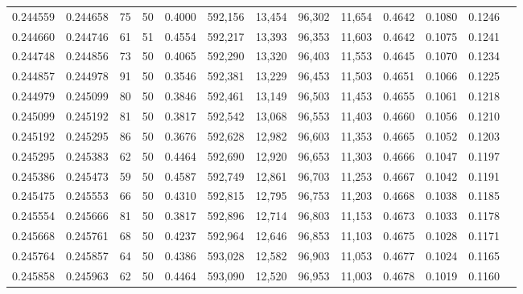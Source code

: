 \begin{tabular}{rrrrrrrrrrrrr}
0.244559 & 0.244658 &    75 &  50 &                                     0.4000 & 592,156 &  13,454 &  96,302 &  11,654 & 0.4642 & 0.1080 & 0.1246 \\
0.244660 & 0.244746 &    61 &  51 &                                     0.4554 & 592,217 &  13,393 &  96,353 &  11,603 & 0.4642 & 0.1075 & 0.1241 \\
0.244748 & 0.244856 &    73 &  50 &                                     0.4065 & 592,290 &  13,320 &  96,403 &  11,553 & 0.4645 & 0.1070 & 0.1234 \\
0.244857 & 0.244978 &    91 &  50 &                                     0.3546 & 592,381 &  13,229 &  96,453 &  11,503 & 0.4651 & 0.1066 & 0.1225 \\
0.244979 & 0.245099 &    80 &  50 &                                     0.3846 & 592,461 &  13,149 &  96,503 &  11,453 & 0.4655 & 0.1061 & 0.1218 \\
0.245099 & 0.245192 &    81 &  50 &                                     0.3817 & 592,542 &  13,068 &  96,553 &  11,403 & 0.4660 & 0.1056 & 0.1210 \\
0.245192 & 0.245295 &    86 &  50 &                                     0.3676 & 592,628 &  12,982 &  96,603 &  11,353 & 0.4665 & 0.1052 & 0.1203 \\
0.245295 & 0.245383 &    62 &  50 &                                     0.4464 & 592,690 &  12,920 &  96,653 &  11,303 & 0.4666 & 0.1047 & 0.1197 \\
0.245386 & 0.245473 &    59 &  50 &                                     0.4587 & 592,749 &  12,861 &  96,703 &  11,253 & 0.4667 & 0.1042 & 0.1191 \\
0.245475 & 0.245553 &    66 &  50 &                                     0.4310 & 592,815 &  12,795 &  96,753 &  11,203 & 0.4668 & 0.1038 & 0.1185 \\
0.245554 & 0.245666 &    81 &  50 &                                     0.3817 & 592,896 &  12,714 &  96,803 &  11,153 & 0.4673 & 0.1033 & 0.1178 \\
0.245668 & 0.245761 &    68 &  50 &                                     0.4237 & 592,964 &  12,646 &  96,853 &  11,103 & 0.4675 & 0.1028 & 0.1171 \\
0.245764 & 0.245857 &    64 &  50 &                                     0.4386 & 593,028 &  12,582 &  96,903 &  11,053 & 0.4677 & 0.1024 & 0.1165 \\
0.245858 & 0.245963 &    62 &  50 &                                     0.4464 & 593,090 &  12,520 &  96,953 &  11,003 & 0.4678 & 0.1019 & 0.1160 \\

\end{tabular}

